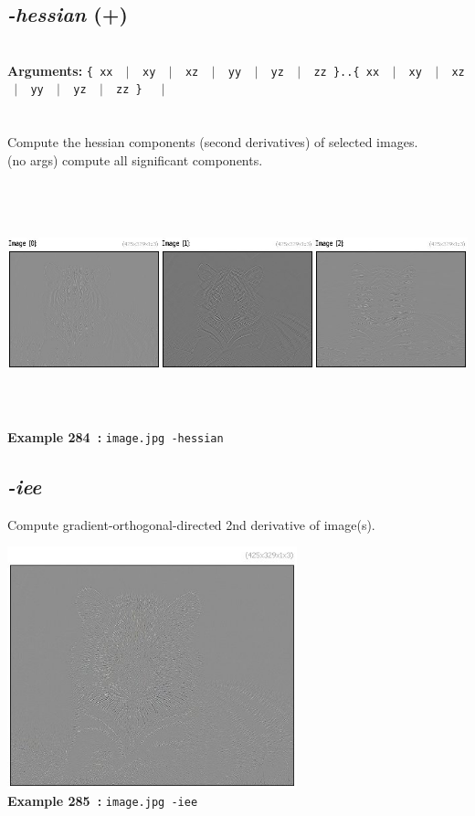 \documentclass[a4paper,11pt,twoside]{book}
\begin{document}
\subsection{\emph{-hessian} (+)}\vspace*{-0.5em}
~\\\textbf{Arguments: } 
{\small \texttt{\{ xx ~$|$~ xy ~$|$~ xz ~$|$~ yy ~$|$~ yz ~$|$~ zz \}..\{ xx ~$|$~ xy ~$|$~ xz ~$|$~ yy ~$|$~ yz ~$|$~ zz \}}}~~~$|$\\
\\~\\
Compute the hessian components (second derivatives) of selected images.
~\\(no args) compute all significant components.
\begin{center}\includegraphics[keepaspectratio=true,height=7cm,width=\textwidth]{img/gmic_def284.jpg}\\
{\footnotesize \textbf{Example 284~:} \texttt{image.jpg -hessian}}
\end{center}

\subsection{\emph{-iee} }\vspace*{-0.5em}
Compute gradient-orthogonal-directed 2nd derivative of image(s).
\begin{center}\includegraphics[keepaspectratio=true,height=7cm,width=\textwidth]{img/gmic_def285.jpg}\\
{\footnotesize \textbf{Example 285~:} \texttt{image.jpg -iee}}
\end{center}
\end{document}
